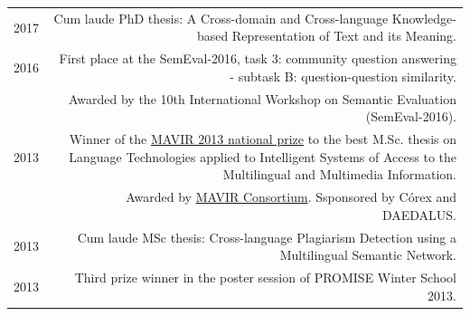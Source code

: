 \documentclass[10pt]{article}
\begin{document}
       \begin{tabular}{L!{\VRule}R}
	2017 & Cum laude PhD thesis: A Cross-domain and Cross-language Knowledge-based Representation of Text and its Meaning.\vspace{5pt}\\
	2016 & First place at the SemEval-2016, task 3: community question answering - subtask B: question-question similarity.\\
     &\scriptsize{Awarded by the 10th International Workshop on Semantic Evaluation (SemEval-2016).}\\
	2013 & Winner of the \href{}{MAVIR 2013 national prize} to the best M.Sc. thesis on Language Technologies applied to Intelligent Systems of Access
	to the Multilingual and Multimedia Information.\\
	&\scriptsize{Awarded by \href{}{MAVIR Consortium}. Ssponsored by C{\'o}rex and DAEDALUS.}\vspace{5pt}\\
        2013 & Cum laude MSc thesis: Cross-language Plagiarism Detection using a Multilingual Se\-man\-tic Network.\vspace{5pt}\\
	2013 & Third prize winner in the poster session of PROMISE Winter School 2013.\vspace{5pt}\\
\end{tabular}
\end{document}
